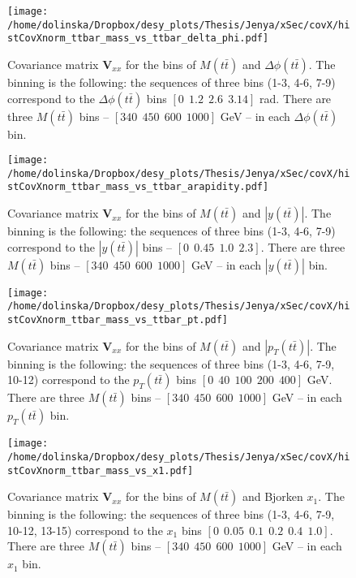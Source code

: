 \begin{figure}[p]
  \centering
  \texttt{[image: /home/dolinska/Dropbox/desy\_plots/Thesis/Jenya/xSec/covX/histCovXnorm\_ttbar\_mass\_vs\_ttbar\_delta\_phi.pdf]}
  \caption{Covariance matrix $\mathbf{V}_{xx}$ for the bins of $M(t\bar{t})$ and $\Delta\phi(t\bar{t})$. The binning is the following:
  the sequences of three bins (1-3, 4-6, 7-9) correspond to the $\Delta\phi(t\bar{t})$ bins $[0\:\:1.2\:\:2.6\:\:3.14]$ rad.
          There are three $M(t\bar{t})$ bins -- $[340\:\:450\:\:600\:\:1000]$ GeV -- in each $\Delta\phi(t\bar{t})$ bin.}
  \label{fig:corr_matr_phi_Mtt}
\end{figure}

\begin{figure}[p]
  \centering
  \texttt{[image: /home/dolinska/Dropbox/desy\_plots/Thesis/Jenya/xSec/covX/histCovXnorm\_ttbar\_mass\_vs\_ttbar\_arapidity.pdf]}
  \caption{Covariance matrix $\mathbf{V}_{xx}$ for the bins of $M(t\bar{t})$ and $|y(t\bar{t})|$. The binning is the following:
  the sequences of three bins (1-3, 4-6, 7-9) correspond to the $|y(t\bar{t})|$ bins -- $[0\:\:0.45\:\:1.0\:\:2.3]$.
          There are three $M(t\bar{t})$ bins -- $[340\:\:450\:\:600\:\:1000]$ GeV -- in each $|y(t\bar{t})|$ bin.}
  \label{fig:corr_matr_ytt_Mtt}
\end{figure}

\begin{figure}[p]
  \centering
  \texttt{[image: /home/dolinska/Dropbox/desy\_plots/Thesis/Jenya/xSec/covX/histCovXnorm\_ttbar\_mass\_vs\_ttbar\_pt.pdf]}
  \caption{Covariance matrix $\mathbf{V}_{xx}$ for the bins of $M(t\bar{t})$ and $|p_{T}(t\bar{t})|$. The binning is the following:
  the sequences of three bins (1-3, 4-6, 7-9, 10-12) correspond to the $p_{T}(t\bar{t})$ bins $[0\:\:40\:\:100\:\:200\:\:400]$ GeV.
          There are three $M(t\bar{t})$ bins -- $[340\:\:450\:\:600\:\:1000]$ GeV -- in each $p_{T}(t\bar{t})$ bin.}
  \label{fig:corr_matr_pttt_Mtt}
\end{figure}

\begin{figure}[p]
  \centering
  \texttt{[image: /home/dolinska/Dropbox/desy\_plots/Thesis/Jenya/xSec/covX/histCovXnorm\_ttbar\_mass\_vs\_x1.pdf]}
  \caption{Covariance matrix $\mathbf{V}_{xx}$ for the bins of $M(t\bar{t})$ and Bjorken $x_{1}$. The binning is the following:
  the sequences of three bins (1-3, 4-6, 7-9, 10-12, 13-15) correspond to the $x_{1}$ bins $[0\:\:0.05\:\:0.1\:\:0.2\:\:0.4\:\:1.0]$.
          There are three $M(t\bar{t})$ bins -- $[340\:\:450\:\:600\:\:1000]$ GeV -- in each $x_{1}$ bin.}
  \label{fig:corr_matr_x1_Mtt}
\end{figure}

